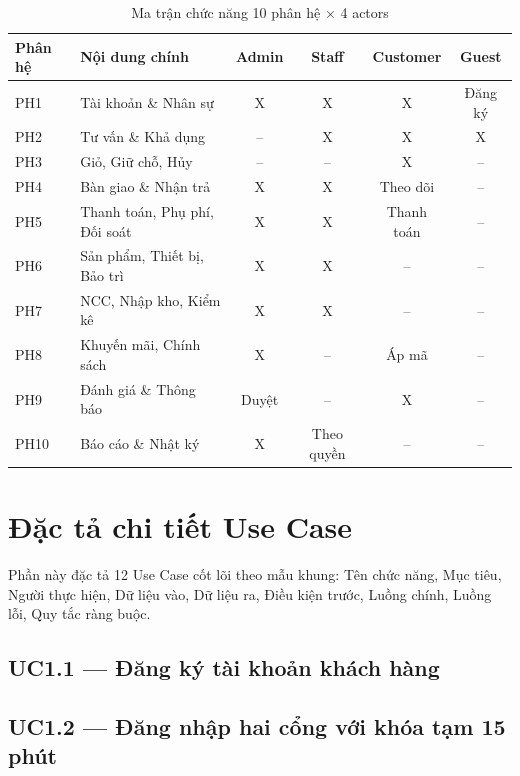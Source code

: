 \begin{table}[H]
\centering
\caption{Ma trận chức năng 10 phân hệ $\times$ 4 actors}
\label{tab:matran_chucnang}
\begin{tabularx}{\textwidth}{|l|X|c|c|c|c|}
\hline
\textbf{Phân hệ} & \textbf{Nội dung chính} & \textbf{Admin} & \textbf{Staff} & \textbf{Customer} & \textbf{Guest} \\ \hline
PH1  & Tài khoản \& Nhân sự                & X & X & X & Đăng ký \\ \hline
PH2  & Tư vấn \& Khả dụng                  & -- & X & X & X \\ \hline
PH3  & Giỏ, Giữ chỗ, Hủy                   & -- & -- & X & -- \\ \hline
PH4  & Bàn giao \& Nhận trả                & X & X & Theo dõi & -- \\ \hline
PH5  & Thanh toán, Phụ phí, Đối soát       & X & X & Thanh toán & -- \\ \hline
PH6  & Sản phẩm, Thiết bị, Bảo trì         & X & X & -- & -- \\ \hline
PH7  & NCC, Nhập kho, Kiểm kê              & X & X & -- & -- \\ \hline
PH8  & Khuyến mãi, Chính sách              & X & -- & Áp mã & -- \\ \hline
PH9  & Đánh giá \& Thông báo               & Duyệt & -- & X & -- \\ \hline
PH10 & Báo cáo \& Nhật ký                  & X & Theo quyền & -- & -- \\ \hline
\end{tabularx}
\end{table}

\section{Đặc tả chi tiết Use Case}
\label{sec:dac_ta_uc}

Phần này đặc tả 12 Use Case cốt lõi theo mẫu khung: Tên chức năng, Mục tiêu, Người thực hiện, Dữ liệu vào, Dữ liệu ra, Điều kiện trước, Luồng chính, Luồng lỗi, Quy tắc ràng buộc.

\subsection{UC1.1 --- Đăng ký tài khoản khách hàng}

\subsection{UC1.2 --- Đăng nhập hai cổng với khóa tạm 15 phút}

